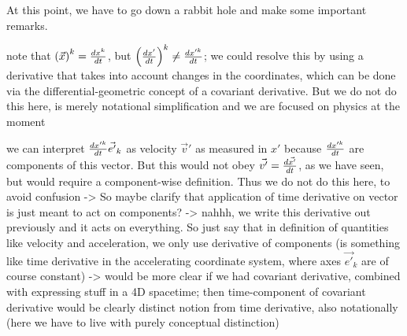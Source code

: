\documentclass[../class_mech_main.tex]{subfiles}
\begin{document}
At this point, we have to go down a rabbit hole and make some important remarks.

note that $\qty(\vec{x})^k = \dv{x^k}{t}$, but $\qty(\dv{x'}{t})^k \neq \dv{x'^k}{t}$; we could resolve this by using a derivative that takes into account changes in the coordinates, which can be done via the differential-geometric concept of a covariant derivative. But we do not do this here, is merely notational simplification and we are focused on physics at the moment

we can interpret $\dv{x'^k}{t} \vec{e'}_k$ as velocity $\vec{v}'$ as measured in $x'$ because $\dv{x'^k}{t}$ are components of this vector. But this would not obey $\vec{v'} = \dv{\vec{x'}}{t}$, as we have seen, but would require a component-wise definition. Thus we do not do this here, to avoid confusion  -> So maybe clarify that application of time derivative on vector is just meant to act on components? -> nahhh, we write this derivative out previously and it acts on everything. So just say that in definition of quantities like velocity and acceleration, we only use derivative of components (is something like time derivative in the accelerating coordinate system, where axes $\vec{e'}_k$ are of course constant) -> would be more clear if we had covariant derivative, combined with expressing stuff in a 4D spacetime; then time-component of covariant derivative would be clearly distinct notion from time derivative, also notationally (here we have to live with purely conceptual distinction)\\
\end{document}
